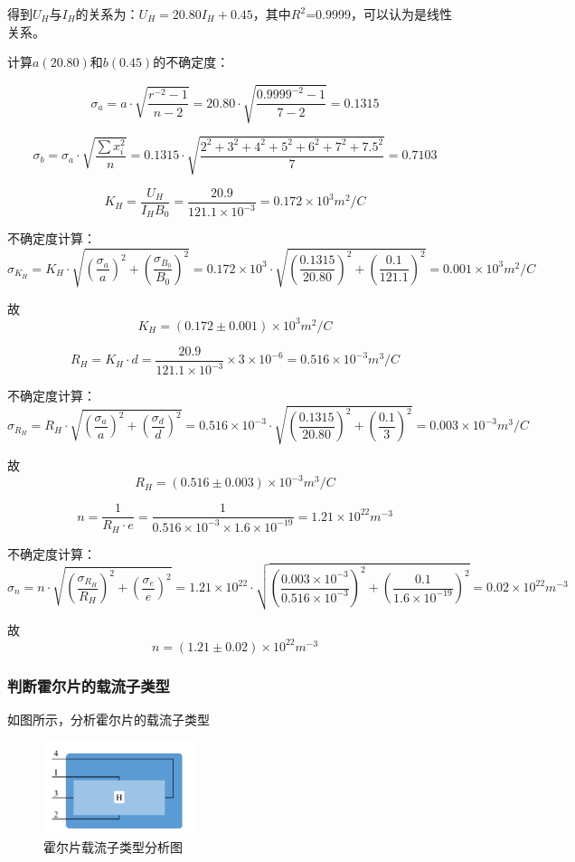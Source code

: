 \documentclass[UTF8]{ctexart}
\begin{document}
得到$U_H$与$I_H$的关系为：$U_H = 20.80I_H + 0.45$，其中$R^2$=0.9999，可以认为是线性关系。

计算$a(20.80)$和$b(0.45)$的不确定度：

$$\sigma_a=a\cdot\sqrt{\frac{r^{-2}-1}{n-2}}=20.80\cdot\sqrt{\frac{0.9999^{-2}-1}{7-2}}=0.1315$$

$$\sigma_b=\sigma_a\cdot\sqrt{\frac{\sum x_i^2}{n}}=0.1315\cdot\sqrt{\frac{2^2+3^2+4^2+5^2+6^2+7^2+7.5^2}{7}}=0.7103$$

$$K_H=\frac{U_H}{I_HB_0}=\frac{20.9}{121.1\times10^{-3}}=0.172\times10^{3}m^2/C$$

不确定度计算：$$\sigma_{K_H}=K_H\cdot\sqrt{\left(\frac{\sigma_a}{a}\right)^2+\left(\frac{\sigma_{B_0}}{B_0}\right)^2}=0.172\times10^{3}\cdot\sqrt{\left(\frac{0.1315}{20.80}\right)^2+\left(\frac{0.1}{121.1}\right)^2}=0.001\times10^{3}m^2/C$$

故$$K_H=(0.172\pm0.001)\times10^{3}m^2/C$$

$$R_H=K_H\cdot d=\frac{20.9}{121.1\times10^{-3}}\times3\times10^{-6}=0.516\times10^{-3}m^3/C$$

不确定度计算：$$\sigma_{R_H}=R_H\cdot\sqrt{\left(\frac{\sigma_a}{a}\right)^2+\left(\frac{\sigma_d}{d}\right)^2}=0.516\times10^{-3}\cdot\sqrt{\left(\frac{0.1315}{20.80}\right)^2+\left(\frac{0.1}{3}\right)^2}=0.003\times10^{-3}m^3/C$$

故$$R_H=(0.516\pm0.003)\times10^{-3}m^3/C$$

$$n=\frac{1}{R_H\cdot e}=\frac{1}{0.516\times10^{-3}\times1.6\times10^{-19}}=1.21\times10^{22}m^{-3}$$

不确定度计算：$$\sigma_n=n\cdot\sqrt{\left(\frac{\sigma_{R_H}}{R_H}\right)^2+\left(\frac{\sigma_e}{e}\right)^2}=1.21\times10^{22}\cdot\sqrt{\left(\frac{0.003\times10^{-3}}{0.516\times10^{-3}}\right)^2+\left(\frac{0.1}{1.6\times10^{-19}}\right)^2}=0.02\times10^{22}m^{-3}$$

故$$n=(1.21\pm0.02)\times10^{22}m^{-3}$$

\subsubsection{判断霍尔片的载流子类型}

如图所示，分析霍尔片的载流子类型

\begin{center}
    \begin{figure}[H]
        \centering
        \includegraphics[width=0.4\textwidth]{img/Hall_effect_type.png}
        \caption{霍尔片载流子类型分析图}
        \label{Hall_effect_type}
    \end{figure}
\end{center}
\end{document}

